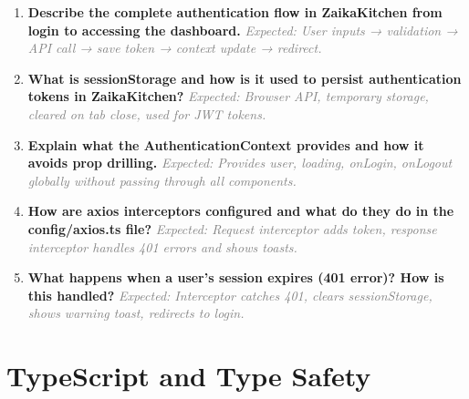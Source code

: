 \documentclass[12pt]{article}
\begin{document}
\begin{enumerate}[label=\textbf{\arabic*.}, itemsep=0.5cm, start=11]

\item \textbf{Describe the complete authentication flow in ZaikaKitchen from login to accessing the dashboard.}
\newline
\textcolor{gray}{\textit{Expected: User inputs → validation → API call → save token → context update → redirect.}}

\item \textbf{What is sessionStorage and how is it used to persist authentication tokens in ZaikaKitchen?}
\newline
\textcolor{gray}{\textit{Expected: Browser API, temporary storage, cleared on tab close, used for JWT tokens.}}

\item \textbf{Explain what the AuthenticationContext provides and how it avoids prop drilling.}
\newline
\textcolor{gray}{\textit{Expected: Provides user, loading, onLogin, onLogout globally without passing through all components.}}

\item \textbf{How are axios interceptors configured and what do they do in the config/axios.ts file?}
\newline
\textcolor{gray}{\textit{Expected: Request interceptor adds token, response interceptor handles 401 errors and shows toasts.}}

\item \textbf{What happens when a user's session expires (401 error)? How is this handled?}
\newline
\textcolor{gray}{\textit{Expected: Interceptor catches 401, clears sessionStorage, shows warning toast, redirects to login.}}

\end{enumerate}

\section*{TypeScript and Type Safety}
\end{document}
